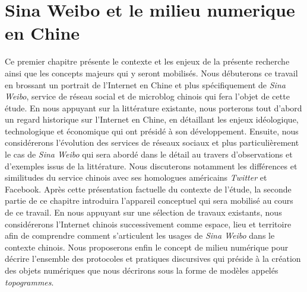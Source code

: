 ﻿\chapter{Sina Weibo et le milieu numerique en Chine} 
\label{sec:internet-chine}
Ce premier chapitre présente le contexte et les enjeux de la présente recherche ainsi que les concepts majeurs qui y seront mobilisés. Nous débuterons ce travail en brossant un portrait de l’Internet en Chine et plus spécifiquement de \textit{Sina Weibo}, service de réseau social et de microblog chinois qui fera l’objet de cette étude. En nous appuyant sur la littérature existante, nous porterons tout d’abord un regard historique sur l’Internet en Chine, en détaillant les enjeux idéologique, technologique et économique qui ont présidé à son développement. Ensuite, nous considérerons l’évolution des services de réseaux sociaux et plus particulièrement le cas de \textit{Sina Weibo} qui sera abordé dans le détail au travers d’observations et d’exemples issus de la littérature. Nous discuterons notamment les différences et similitudes du service chinois avec ses homologues américains \textit{Twitter} et Facebook. Après cette présentation factuelle du contexte de l’étude, la seconde partie de ce chapitre introduira l’appareil conceptuel qui sera mobilisé au cours de ce travail. En nous appuyant sur une sélection de travaux existants, nous considérerons l’Internet chinois successivement comme espace, lieu et territoire afin de comprendre comment s’articulent les usages de \textit{Sina Weibo} dans le contexte chinois. Nous proposerons enfin le concept de milieu numérique pour décrire l’ensemble des protocoles et pratiques discursives qui préside à la création des objets numériques que nous décrirons sous la forme de modèles appelés \textit{topogrammes}.


